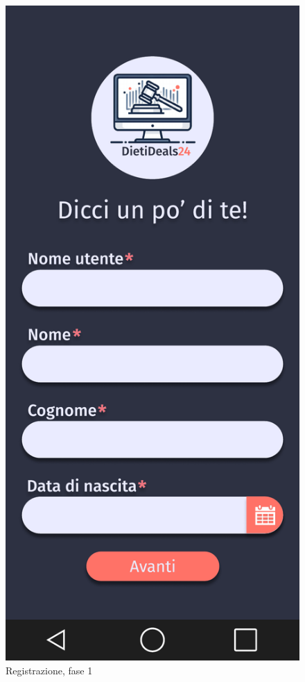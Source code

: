 \begin{figure}[!htb]
\begin{minipage}{0.32\textwidth}
            \includegraphics[width=.7\linewidth]{Immagini/Frames/8.pdf}
            \caption{Registrazione, fase 1}
        \end{minipage}\hfill
    \end{figure}

    \clearpage
    
